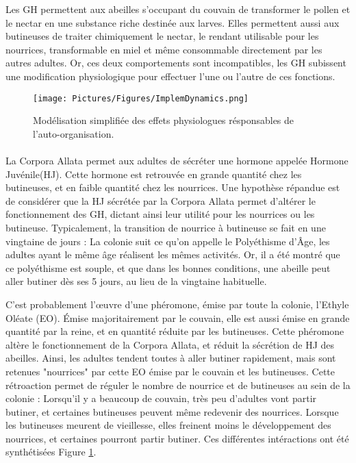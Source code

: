 \documentclass[11pt,a4paper]{report}
\begin{document}
			Les GH permettent aux abeilles s'occupant du couvain de transformer le pollen et le nectar en une substance riche destinée aux larves. Elles permettent aussi aux butineuses de traiter chimiquement le nectar, le rendant utilisable pour les nourrices, transformable en miel et même consommable directement par les autres adultes. Or, ces deux comportements sont incompatibles, les GH subissent une modification physiologique pour effectuer l'une ou l'autre de ces fonctions.
			
			\begin{figure}
			\centering
			\texttt{[image: Pictures/Figures/ImplemDynamics.png]}
			\caption{Modélisation simplifiée des effets physiologues résponsables de l'auto-organisation.}
			\label{HJEODynamics}
			\end{figure}
			
			\paragraph{}
			La Corpora Allata permet aux adultes de sécréter une hormone appelée Hormone Juvénile(HJ). Cette hormone est retrouvée en grande quantité chez les butineuses, et en faible quantité chez les nourrices. Une hypothèse répandue est de considérer que la HJ sécrétée par la Corpora Allata permet d'altérer le fonctionnement des GH, dictant ainsi leur utilité pour les nourrices ou les butineuse. Typicalement, la transition de nourrice à butineuse se fait en une vingtaine de jours : La colonie suit ce qu'on appelle le Polyéthisme d'Âge, les adultes ayant le même âge réalisent les mêmes activités. Or, il a été montré que ce polyéthisme est souple, et que dans les bonnes conditions, une abeille peut aller butiner dès ses 5 jours, au lieu de la vingtaine habituelle.
			
			C'est probablement l'œuvre d'une phéromone, émise par toute la colonie, l'Ethyle Oléate (EO). Émise majoritairement par le couvain, elle est aussi émise en grande quantité par la reine, et en quantité réduite par les butineuses. Cette phéromone altère le fonctionnement de la Corpora Allata, et réduit la sécrétion de HJ des abeilles. Ainsi, les adultes tendent toutes à aller butiner rapidement, mais sont retenues "nourrices" par cette EO émise par le couvain et les butineuses. Cette rétroaction permet de réguler le nombre de nourrice et de butineuses au sein de la colonie : Lorsqu'il y a beaucoup de couvain, très peu d'adultes vont partir butiner, et certaines butineuses peuvent même redevenir des nourrices. Lorsque les butineuses meurent de vieillesse, elles freinent moins le développement des nourrices, et certaines pourront partir butiner. Ces différentes intéractions ont été synthétisées Figure \ref{HJEODynamics}.
			
\end{document}
